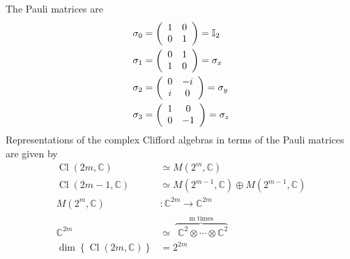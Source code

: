 \documentclass[aps,preprint]{revtex4}%
\begin{document}
The Pauli matrices are
\begin{align}
\mathbb{\sigma}_{0}  &  =\left(
\begin{array}
[c]{cc}%
1 & 0\\
0 & 1
\end{array}
\right)  =\mathbb{I}_{2}\\
\mathbb{\sigma}_{1}  &  =\left(
\begin{array}
[c]{cc}%
0 & 1\\
1 & 0
\end{array}
\right)  =\mathbb{\sigma}_{x}\\
\mathbb{\sigma}_{2}  &  =\left(
\begin{array}
[c]{cc}%
0 & -i\\
i & 0
\end{array}
\right)  =\mathbb{\sigma}_{y}\\
\mathbb{\sigma}_{3}  &  =\left(
\begin{array}
[c]{cc}%
1 & 0\\
0 & -1
\end{array}
\right)  =\mathbb{\sigma}_{z}%
\end{align}
Representations of the complex Clifford algebras in terms of the Pauli
matrices are given by%
\begin{align}
\operatorname*{Cl}\left(  2m,\mathbb{C}\right)   &  \simeq M\left(
2^{m},\mathbb{C}\right) \\
\operatorname*{Cl}\left(  2m-1,\mathbb{C}\right)   &  \simeq M\left(
2^{m-1},\mathbb{C}\right)  \oplus M\left(  2^{m-1},\mathbb{C}\right) \\
M\left(  2^{m},\mathbb{C}\right)   &  :\mathbb{C}^{2m}\rightarrow
\mathbb{C}^{2m}\\
\mathbb{C}^{2m}  &  \simeq\,\overset{\text{m times}}{\overbrace{\,\,\mathbb{C}%
^{2}\otimes\cdots\otimes\mathbb{C}^{2}}}\\
\dim\left\{  \operatorname*{Cl}\left(  2m,\mathbb{C}\right)  \right\}   &
=2^{2m}%
\end{align}
\end{document}
